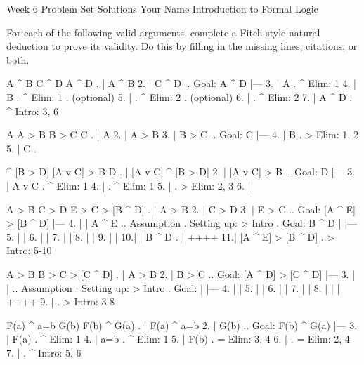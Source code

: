 

\heading
Week 6 Problem Set Solutions
Your Name
Introduction to Formal Logic
\endheading

For each of the following valid arguments, complete a Fitch-style natural deduction to prove its validity. Do this by filling in the missing lines, citations, or both.

\problems
{}
\argument
 A ^ B
 C ^ D
\argumentline
 A ^ D
\endargument
	\answer
	. | A ^ B
	 2. | C ^ D  ..  Goal: A ^ D
	    |---
	 3. | A      .  ^ Elim: 1
	 4. | B      .  ^ Elim: 1  .  (optional)
	 5. |        .  ^ Elim: 2  .  (optional)
	 6. |        .  ^ Elim: 2
	 7. | A ^ D  .  ^ Intro: 3, 6
	\endfitchproof
	\endanswer

\argument
 A
 A > B
 B > C
\argumentline
 C
\endargument
	\answer
	. | A
	 2. | A > B
	 3. | B > C  ..  Goal: C
	    |---
	 4. | B      .  > Elim: 1, 2
	 5. | C      .  
	\endfitchproof
	\endanswer

\argument
 [A v C] ^ [B > D]
 [A v C] > B
\argumentline
 D
\endargument
	\answer
	. | [A v C] ^ [B > D]
	 2. | [A v C] > B        ..  Goal: D
	    |---
	 3. | A v C              .  ^ Elim: 1
	 4. |                    .  ^ Elim: 1
	 5. |                    .  > Elim: 2, 3
	 6. | 
	\endfitchproof
	\endanswer

\argument
 A > B
 C > D
 E > C
\argumentline
 [A ^ E] > [B ^ D]
\endargument
	\answer
	. | A > B
	 2. | C > D
	 3. | E > C     ..  Goal: [A ^ E] > [B ^ D]
	    |---
	 4. |  | A ^ E  ..  Assumption  .  Setting up: > Intro  .  Goal: B ^ D
	    |  |---
	 5. |  | 
	 6. |  | 
	 7. |  | 
	 8. |  | 
	 9. |  | 
	 10.|  | B ^ D  .  
	    |  ++++
	 11.| [A ^ E] > [B ^ D]  .  > Intro: 5-10
	\endfitchproof
	\endanswer

\argument
 A > B
 B > C
\argumentline
 [A ^ D] > [C ^ D]
\endargument
	\answer
	. | A > B
	 2. | B > C     ..  Goal: [A ^ D] > [C ^ D]
	    |---
	 3. |  |        ..  Assumption  .  Setting up: > Intro  .  Goal: 
	    |  |---
	 4. |  | 
	 5. |  | 
	 6. |  | 
	 7. |  | 
	 8. |  | 
	    |  ++++
	 9. |           .  > Intro: 3-8
	\endfitchproof
	\endanswer

\argument
 F(a) ^ a=b
 G(b)
\argumentline
 F(b) ^ G(a)
\endargument
	\answer
	. | F(a) ^ a=b
	 2. | G(b)         ..  Goal: F(b) ^ G(a)
	    |---
	 3. | F(a)         .  ^ Elim: 1
	 4. | a=b          .  ^ Elim: 1
	 5. | F(b)         .  = Elim: 3, 4
	 6. |              .  = Elim: 2, 4
	 7. |              .  ^ Intro: 5, 6
	\endfitchproof
	\endanswer

